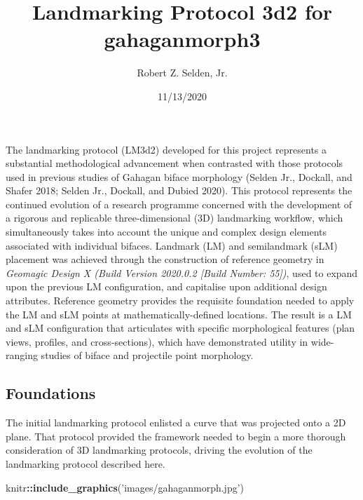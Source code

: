 \documentclass[
]{article}
\title{Landmarking Protocol 3d2 for gahaganmorph3}
\author{Robert Z. Selden, Jr.}
\date{11/13/2020}
\newenvironment{Shaded}{\begin{snugshade}}{\end{snugshade}}
\newcommand{\KeywordTok}[1]{\textcolor[rgb]{0.13,0.29,0.53}{\textbf{#1}}}
\newcommand{\NormalTok}[1]{#1}
\newcommand{\OperatorTok}[1]{\textcolor[rgb]{0.81,0.36,0.00}{\textbf{#1}}}
\newcommand{\StringTok}[1]{\textcolor[rgb]{0.31,0.60,0.02}{#1}}
\begin{document}
\maketitle

The landmarking protocol (LM3d2) developed for this project represents a
substantial methodological advancement when contrasted with those
protocols used in previous studies of Gahagan biface morphology (Selden
Jr., Dockall, and Shafer 2018; Selden Jr., Dockall, and Dubied 2020).
This protocol represents the continued evolution of a research programme
concerned with the development of a rigorous and replicable
three-dimensional (3D) landmarking workflow, which simultaneously takes
into account the unique and complex design elements associated with
individual bifaces. Landmark (LM) and semilandmark (sLM) placement was
achieved through the construction of reference geometry in
\emph{Geomagic Design X (Build Version 2020.0.2 {[}Build Number:
55{]})}, used to expand upon the previous LM configuration, and
capitalise upon additional design attributes. Reference geometry
provides the requisite foundation needed to apply the LM and sLM points
at mathematically-defined locations. The result is a LM and sLM
configuration that articulates with specific morphological features
(plan views, profiles, and cross-sections), which have demonstrated
utility in wide-ranging studies of biface and projectile point
morphology.

\hypertarget{foundations}{%
\subsection{Foundations}\label{foundations}}

The initial landmarking protocol enlisted a curve that was projected
onto a 2D plane. That protocol provided the framework needed to begin a
more thorough consideration of 3D landmarking protocols, driving the
evolution of the landmarking protocol described here.

\begin{Shaded}
\begin{Highlighting}[]
\NormalTok{knitr}\OperatorTok{::}\KeywordTok{include_graphics}\NormalTok{(}\StringTok{'images/gahaganmorph.jpg'}\NormalTok{)}
\end{Highlighting}
\end{Shaded}
\end{document}
